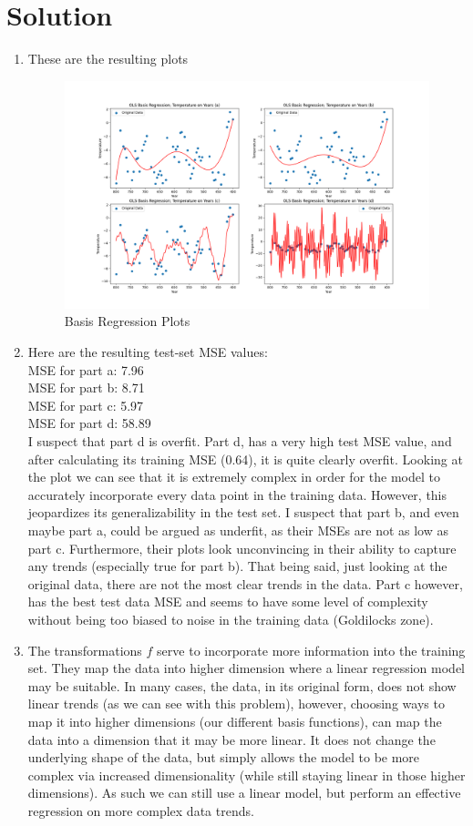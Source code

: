 \documentclass[submit]{harvardml}
\newenvironment{solution}
  {\color{blue}\section*{Solution}}
{}
\begin{document}
\newpage 
\begin{solution}
	\begin{enumerate}
	    \item These are the resulting plots  
                \begin{figure} [htp] \centering                             \includegraphics[width=0.8\linewidth]{img_output/p3.1.png} \caption{Basis Regression Plots} \label{fig:enter-label} \end{figure}

            \item Here are the resulting test-set MSE values:
            \\ MSE for part a: 7.96
            \\ MSE for part b: 8.71
            \\ MSE for part c: 5.97
            \\ MSE for part d: 58.89
            \\ I suspect that part d is overfit. Part d, has a very high test MSE value, and after calculating its training MSE (0.64), it is quite clearly overfit. Looking at the plot we can see that it is extremely complex in order for the model to accurately incorporate every data point in the training data. However, this jeopardizes its generalizability in the test set. I suspect that part b, and even maybe part a, could be argued as underfit, as their MSEs are not as low as part c. Furthermore, their plots look unconvincing in their ability to capture any trends (especially true for part b). That being said, just looking at the original data, there are not the most clear trends in the data. Part c however, has the best test data MSE and seems to have some level of complexity without being too biased to noise in the training data (Goldilocks zone). 

            \item The transformations $f$ serve to incorporate more information into the training set. They map the data into  higher dimension where a linear regression model may be suitable. In many cases, the data, in its original form, does not show linear trends (as we can see with this problem), however, choosing ways to map it into higher dimensions (our different basis functions), can map the data into a dimension that it may be more linear. It does not change the underlying shape of the data, but simply allows the model to be more complex via increased dimensionality (while still staying linear in those higher dimensions). As such we can still use a linear model, but perform an effective regression on more complex data trends. 


\end{enumerate}
\end{solution}
\end{document}
